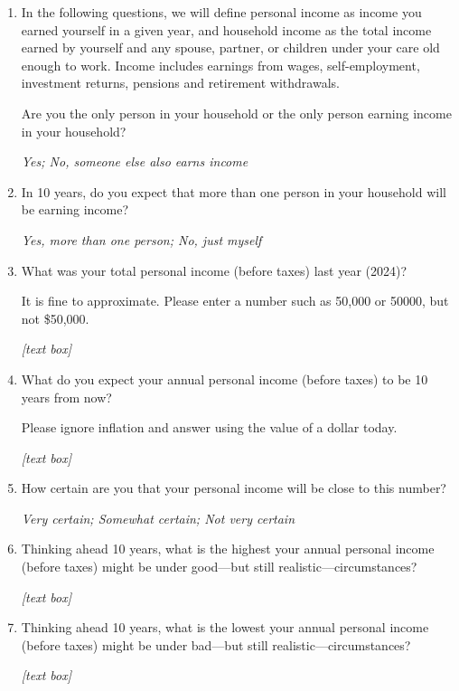 \documentclass[11pt, headsepline]{article}
\begin{document}
\begin{enumerate}[resume]

    \item In the following questions, we will define personal income as income you earned yourself in a given year, and household income as the total income earned by yourself and any spouse, partner, or children under your care old enough to work. Income includes earnings from wages, self-employment, investment returns, pensions and retirement withdrawals.
    
    Are you the only person in your household or the only person earning income in your household?

    \textit{Yes; No, someone else also earns income}

    \item In 10 years, do you expect that more than one person in your household will be earning income? 

    \textit{Yes, more than one person; No, just myself}

    \item What was your total personal income (before taxes) last year (2024)?

    It is fine to approximate. Please enter a number such as 50,000 or 50000, but not \$50,000.

    \textit{[text box]}

    \item What do you expect your annual personal income (before taxes) to be 10 years from now?

    Please ignore inflation and answer using the value of a dollar today.

    \textit{[text box]}

    \item How certain are you that your personal income will be close to this number?

    \textit{Very certain; Somewhat certain; Not very certain}

    \item Thinking ahead 10 years, what is the highest your annual personal income (before taxes) might be under good—but still realistic—circumstances?

    \textit{[text box]}

    \item Thinking ahead 10 years, what is the lowest your annual personal income (before taxes) might be under bad—but still realistic—circumstances?

    \textit{[text box]}


\end{enumerate}
\end{document}
